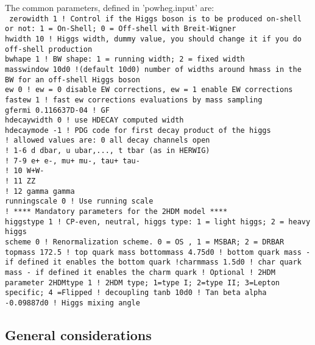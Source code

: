 \documentclass[paper]{JHEP3}
\begin{document}
The  common parameters, defined in 'powheg.input' are: \\
{\tt
zerowidth 1 ! Control if the Higgs boson is to be produced on-shell or not: 1 = On-Shell; 0 = Off-shell with Breit-Wigner\\
hwidth 10   ! Higgs width, dummy value, you should change it if you do off-shell production\\
bwhape 1       ! BW shape: 1 = running width; 2 = fixed width\\
masswindow 10d0  !(default 10d0) number of widths around hmass in the BW for an off-shell Higgs boson\\
ew 0                     ! ew = 0 disable EW corrections, ew = 1 enable EW corrections\\
fastew 1                   ! fast ew corrections evaluations by mass sampling\\
gfermi 0.116637D-04        ! GF\\
hdecaywidth 0   ! use HDECAY computed width\\
hdecaymode -1      ! PDG code for first decay product of the higgs\\
! allowed values are:  0 all decay channels open\\
!                      1-6 d dbar, u ubar,..., t tbar (as in HERWIG)\\
!                      7-9 e+ e-, mu+ mu-, tau+ tau-\\
!                      10  W+W-\\
!                      11  ZZ\\
!                      12  gamma gamma\\
runningscale 0 ! Use running scale\\
! **** Mandatory parameters for the 2HDM model ****\\
higgstype 1 ! CP-even, neutral, higgs type: 1 = light higgs; 2 = heavy higgs\\
scheme 0    ! Renormalization scheme. 0 = OS , 1 = MSBAR; 2 = DRBAR
topmass 172.5        ! top quark mass
bottommass 4.75d0    ! bottom quark mass - if defined it enables the bottom quark
!charmmass 1.5d0     ! char quark mass - if defined it enables the charm quark
! Optional
! 2HDM parameter
2HDMtype 1           ! 2HDM type; 1=type I; 2=type II; 3=Lepton specific; 4 =Flipped
! decoupling
tanb 10d0            ! Tan beta
alpha -0.09887d0     ! Higgs mixing angle
}

\subsection{General considerations}
\end{document}
